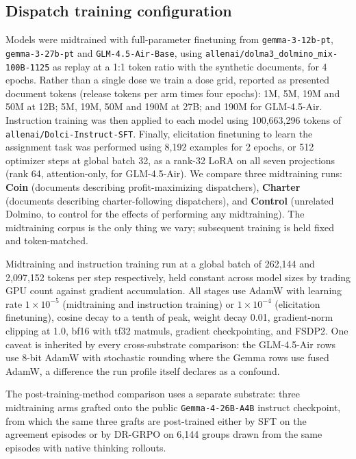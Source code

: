 \subsection{Dispatch training configuration}

Models were midtrained with full-parameter finetuning from \texttt{gemma-3-12b-pt}, \texttt{gemma-3-27b-pt} and \texttt{GLM-4.5-Air-Base}, using \texttt{allenai/dolma3\_dolmino\_mix-100B-1125} as replay at a 1:1 token ratio with the synthetic documents, for 4 epochs. Rather than a single dose we train a dose grid, reported as presented document tokens (release tokens per arm times four epochs): 1M, 5M, 19M and 50M at 12B; 5M, 19M, 50M and 190M at 27B; and 190M for GLM-4.5-Air. Instruction training was then applied to each model using 100,663,296 tokens of \texttt{allenai/Dolci-Instruct-SFT}. Finally, elicitation finetuning to learn the assignment task was performed using 8,192 examples for 2 epochs, or 512 optimizer steps at global batch 32, as a rank-32 LoRA on all seven projections (rank 64, attention-only, for GLM-4.5-Air). We compare three midtraining runs: \textbf{Coin} (documents describing profit-maximizing dispatchers), \textbf{Charter} (documents describing charter-following dispatchers), and \textbf{Control} (unrelated Dolmino, to control for the effects of performing any midtraining). The midtraining corpus is the only thing we vary; subsequent training is held fixed and token-matched.

Midtraining and instruction training run at a global batch of 262,144 and 2,097,152 tokens per step respectively, held constant across model sizes by trading GPU count against gradient accumulation. All stages use AdamW with learning rate $1\times10^{-5}$ (midtraining and instruction training) or $1\times10^{-4}$ (elicitation finetuning), cosine decay to a tenth of peak, weight decay 0.01, gradient-norm clipping at 1.0, bf16 with tf32 matmuls, gradient checkpointing, and FSDP2. One caveat is inherited by every cross-substrate comparison: the GLM-4.5-Air rows use 8-bit AdamW with stochastic rounding where the Gemma rows use fused AdamW, a difference the run profile itself declares as a confound.

The post-training-method comparison uses a separate substrate: three midtraining arms grafted onto the public \texttt{Gemma-4-26B-A4B} instruct checkpoint, from which the same three grafts are post-trained either by SFT on the agreement episodes or by DR-GRPO on 6,144 groups drawn from the same episodes with native thinking rollouts.

